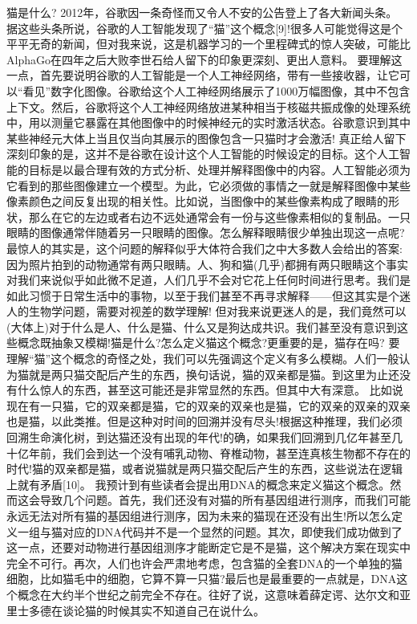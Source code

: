 猫是什么?
2012年，谷歌因一条奇怪而又令人不安的公告登上了各大新闻头条。
据这些头条所说，谷歌的人工智能发现了“猫”这个概念[9]!很多人可能觉得这是个平平无奇的新闻，但对我来说，这是机器学习的一个里程碑式的惊人突破，可能比AlphaGo在四年之后大败李世石给人留下的印象更深刻、更出人意料。
要理解这一点，首先要说明谷歌的人工智能是一个人工神经网络，带有一些接收器，让它可以“看见”数字化图像。谷歌给这个人工神经网络展示了1000万幅图像，其中不包含上下文。然后，谷歌将这个人工神经网络放进某种相当于核磁共振成像的处理系统中，用以测量它暴露在其他图像中的时候神经元的实时激活状态。谷歌意识到其中某些神经元大体上当且仅当向其展示的图像包含一只猫时才会激活!
真正给人留下深刻印象的是，这并不是谷歌在设计这个人工智能的时候设定的目标。这个人工智能的目标是以最合理有效的方式分析、处理并解释图像中的内容。人工智能必须为它看到的那些图像建立一个模型。为此，它必须做的事情之一就是解释图像中某些像素颜色之间反复出现的相关性。比如说，当图像中的某些像素构成了眼睛的形
状，那么在它的左边或者右边不远处通常会有一份与这些像素相似的复制品。一只眼睛的图像通常伴随着另一只眼睛的图像。怎么解释眼睛很少单独出现这一点呢?
最惊人的其实是，这个问题的解释似乎大体符合我们之中大多数人会给出的答案:因为照片拍到的动物通常有两只眼睛。人、狗和猫(几乎)都拥有两只眼睛这个事实对我们来说似乎如此微不足道，人们几乎不会对它花上任何时间进行思考。我们是如此习惯于日常生活中的事物，以至于我们甚至不再寻求解释——但这其实是个迷人的生物学问题，需要对视差的数学理解!
但对我来说更迷人的是，我们竟然可以(大体上)对于什么是人、什么是猫、什么又是狗达成共识。我们甚至没有意识到这些概念既抽象又模糊!猫是什么?怎么定义猫这个概念?更重要的是，猫存在吗?
要理解“猫”这个概念的奇怪之处，我们可以先强调这个定义有多么模糊。人们一般认为猫就是两只猫交配后产生的东西，换句话说，猫的双亲都是猫。到这里为止还没有什么惊人的东西，甚至这可能还是非常显然的东西。但其中大有深意。
比如说现在有一只猫，它的双亲都是猫，它的双亲的双亲也是猫，它的双亲的双亲的双亲也是猫，以此类推。但是这种对时间的回溯并没有尽头!根据这种推理，我们必须回溯生命演化树，到达猫还没有出现的年代!的确，如果我们回溯到几亿年甚至几十亿年前，我们会到达一个没有哺乳动物、脊椎动物，甚至连真核生物都不存在的时代!猫的双亲都是猫，或者说猫就是两只猫交配后产生的东西，这些说法在逻辑上就有矛盾[10]。
我预计到有些读者会提出用DNA的概念来定义猫这个概念。然而这会导致几个问题。首先，我们还没有对猫的所有基因组进行测序，而我们可能永远无法对所有猫的基因组进行测序，因为未来的猫现在还没有出生!所以怎么定义一组与猫对应的DNA代码并不是一个显然的问题。其次，即使我们成功做到了这一点，还要对动物进行基因组测序才能断定它是不是猫，这个解决方案在现实中完全不可行。再次，人们也许会严肃地考虑，包含猫的全套DNA的一个单独的猫细胞，比如猫毛中的细胞，它算不算一只猫?最后也是最重要的一点就是，DNA这个概念在大约半个世纪之前完全不存在。往好了说，这意味着薛定谔、达尔文和亚里士多德在谈论猫的时候其实不知道自己在说什么。
